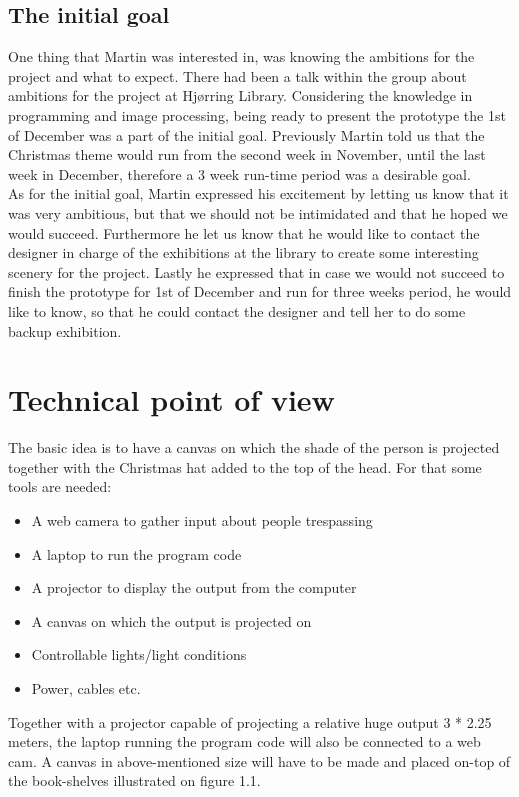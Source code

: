 \subsection{The initial goal}
One thing that Martin was interested in, was knowing the ambitions for the project and what to expect. There had been a talk within the group about ambitions for the project at Hj{\o}rring Library. Considering the knowledge in programming and image processing, being ready to present the prototype the 1st of December was a part of the initial goal. Previously Martin told us that the Christmas theme would run from the second week in November, until the last week in December, therefore a 3 week run-time period was a desirable goal.\\
As for the initial goal, Martin expressed his excitement by letting us know that it was very ambitious, but that we should not be intimidated and that he hoped we would succeed. Furthermore he let us know that he would like to contact the designer in charge of the exhibitions at the library to create some interesting scenery for the project. Lastly he expressed that in case we would not succeed to finish the prototype for 1st of December and run for three weeks period, he would like to know, so that he could contact the designer and tell her to do some backup exhibition.

\section{Technical point of view}
The basic idea is to have a canvas on which the shade of the person is projected together with the Christmas hat added to the top of the head. For that some tools are needed:

\begin{itemize}
\item A web camera to gather input about people trespassing
\item A laptop to run the program code
\item A projector to display the output from the computer
\item A canvas on which the output is projected on
\item Controllable lights/light conditions
\item Power, cables etc.
\end{itemize}

Together with a projector capable of projecting a relative huge output 3 * 2.25 meters, the laptop running the program code will also be connected to a web cam. A canvas in above-mentioned size will have to be made and placed on-top of the book-shelves illustrated on figure 1.1.

